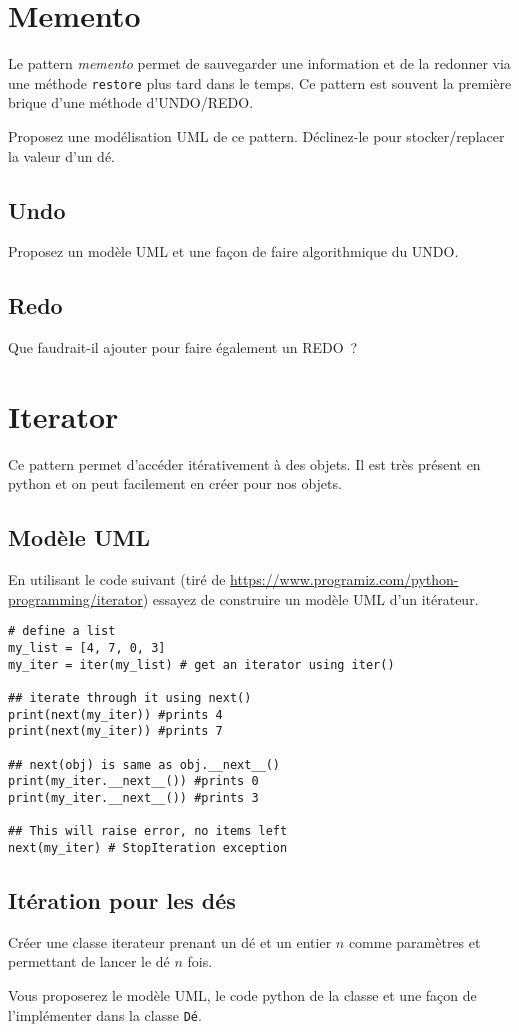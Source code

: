 \documentclass[12pt]{article}
\begin{document}
\section{Memento}

Le pattern {\em memento} permet de sauvegarder une information et de la redonner via une méthode \verb|restore| plus tard dans le temps. Ce pattern est souvent la première brique d'une méthode d'UNDO/REDO.


Proposez une modélisation UML de ce pattern. Déclinez-le pour stocker/replacer la valeur d'un dé.

\subsection{Undo}
Proposez un modèle UML et une façon de faire algorithmique du UNDO. 

\subsection{Redo}

Que faudrait-il ajouter pour faire également un REDO~?


\section{Iterator}

Ce pattern permet d'accéder itérativement à des objets. Il est très présent en python et on peut facilement en créer pour nos objets.

\subsection{Modèle UML}

En utilisant le code suivant (tiré de \url{https://www.programiz.com/python-programming/iterator}) essayez de construire un modèle UML d'un itérateur.

\lstset{language=Python}
\begin{lstlisting}
# define a list
my_list = [4, 7, 0, 3]
my_iter = iter(my_list) # get an iterator using iter()

## iterate through it using next() 
print(next(my_iter)) #prints 4
print(next(my_iter)) #prints 7

## next(obj) is same as obj.__next__()
print(my_iter.__next__()) #prints 0
print(my_iter.__next__()) #prints 3

## This will raise error, no items left
next(my_iter) # StopIteration exception
\end{lstlisting}

\subsection{Itération pour les dés}

Créer une classe iterateur prenant un dé et un entier $n$ comme paramètres et permettant de lancer le dé $n$ fois.

Vous proposerez le modèle UML, le code python de la classe et une façon de l'implémenter dans la classe \verb|Dé|.
\end{document}
